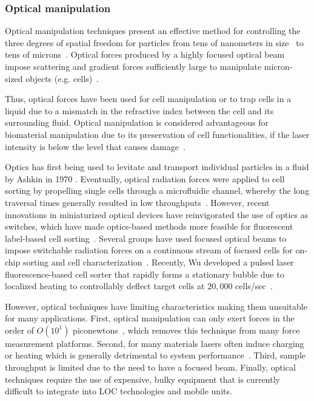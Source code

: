 \subsubsection{Optical manipulation}\label{subsubsec:opticalManipulation}
Optical manipulation techniques present an effective method for controlling the three degrees of spatial freedom for particles from tens of nanometers in size~\cite{Svoboda1994} to tens of microns~\cite{Leach2006,Greulich2016}. Optical forces produced by a highly focused optical beam impose scattering and gradient forces sufficiently large to manipulate micron-sized objects (e.g. cells)~\cite{Neuman2008}.

Thus, optical forces have been used for cell manipulation or to trap cells in a liquid due to a mismatch in the refractive index between the cell and its surrounding fluid. Optical manipulation is considered advantageous for biomaterial manipulation due to its preservation of cell functionalities, if the laser intensity is below the level that causes damage~\cite{Jonas2008}.

Optics has first being used to levitate and transport individual particles in a fluid by Ashkin in 1970 \cite{Ashkin1970}. Eventually, optical radiation forces were applied to cell sorting by propelling single cells through a microfluidic channel, whereby the long traversal times generally resulted in low throughputs~\cite{Buican1987}. However, recent innovations in miniaturized optical devices have reinvigorated the use of optics as switches, which have made optics-based methods more feasible for fluorescent label-based cell sorting~\cite{Wang2005a,Perroud2008,Wang2011}. Several groups have used focused optical beams to impose switchable radiation forces on a continuous stream of focused cells for on-chip sorting and cell characterization~\cite{Wang2005a,Jr2007}. Recently, Wu \etal{} developed a pulsed laser fluorescence-based cell sorter that rapidly forms a stationary bubble due to localized heating to controllably deflect target cells at $20,000$ cells/sec~\cite{Wu2012a}.

However, optical techniques have limiting characteristics making them unsuitable for many applications. First, optical manipulation can only exert forces in the order of $O(10^{1})$  piconewtons~\cite{Simmons1996}, which removes this technique from many force measurement platforms. Second, for many materials lasers often induce charging or heating which is generally detrimental to system performance~\cite{Peterman2003}. Third, sample throughput is limited due to the need to have a focused beam. Finally, optical techniques require the use of expensive, bulky equipment that is currently difficult to integrate into LOC technologies and mobile units. 

